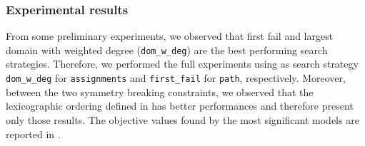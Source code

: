 \subsubsection{Experimental results}

From some preliminary experiments, we observed that first fail and largest domain with weighted degree (\texttt{dom\_w\_deg}) are the best performing search strategies. Therefore, we performed the full experiments using as search strategy \texttt{dom\_w\_deg} for \texttt{assignments} and \texttt{first\_fail} for \texttt{path}, respectively. Moreover, between the two symmetry breaking constraints, we observed that the lexicographic ordering defined in  has better performances and therefore present only those results. The objective values found by the most significant models are reported in .

